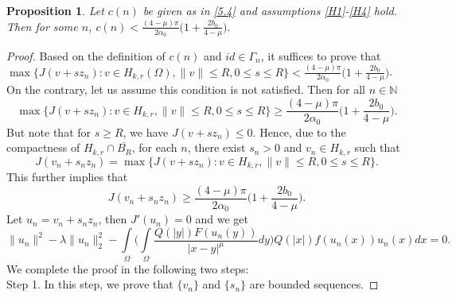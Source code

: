 \documentclass[11pt]{amsart}
\numberwithin{equation}{section}
\newtheorem{prop}[thm]{Proposition}
\newcommand{\1}{\frac{1}{2}}
\begin{document}
	\begin{prop}
		Let $c(n)$ be given as in \eqref{5.4} and assumptions \eqref{H1}-\eqref{H4} hold. Then for some $n$, $c(n)< \frac{(4-\mu)\pi}{2\alpha_0}\Big(1+\frac{2b_0}{4-\mu}\Big).$
	\end{prop}
	\begin{proof}Based on the definition of $c(n)$ and $id\in \Gamma_n$, it suffices to prove that $\max\{ J(v+sz_n): v \in H_{k,r}(\Omega), \|v\| \leq R, 0 \leq s \leq R\} < \frac{(4-\mu)\pi}{2\alpha_0}\Big(1+\frac{2b_0}{4-\mu}\Big)$. 
		On the contrary, let us assume this condition is not satisfied. Then for all $n \in \mathbb{N}$
		\[ \max\{ J(v+sz_n): v\in H_{k,r}, \|v\| \leq R, 0 \leq s \leq R\} \geq \frac{(4-\mu)\pi}{2\alpha_0}\Big(1+\frac{2b_0}{4-\mu}\Big).\]
		But note that for $s \geq R$, we have $J(v+sz_n)\leq0$. Hence, due to the compactness of $H_{k,r} \cap \overline{B_R}$, for each $n$, there exist $s_n>0$ and $v_n \in H_{k,r}$ such that
		\[ J(v_n+s_n z_n) = \max\{ J(v+sz_n): v\in H_{k,r}, \|v\| \leq R, 0 \leq s \leq R\}.\]
		This further implies that
		\begin{equation}
			\label{5.5}
			J(v_n+s_nz_n) \geq \frac{(4-\mu)\pi}{2\alpha_0}\Big(1+\frac{2b_0}{4-\mu}\Big).
		\end{equation}
		Let $u_n = v_n+s_nz_n$, then $J'(u_n)=0$ and we get
		\begin{equation}
			\label{5.6}
			\|u_n\|^2 -\lambda \|u_n\|^2_2 - \int\limits_\Omega \Bigg( \int\limits_\Omega \frac{Q(|y|)F(u_n(y))}{|x-y|^\mu}dy\Bigg) Q(|x|)f(u_n(x))u_n(x)dx =0.
		\end{equation}
		We complete the proof in the following two steps:\\
		Step 1. In this step, we prove that $\{v_n\}$ and $\{s_n\}$ are bounded sequences. 
		

\end{proof}
\end{document}
